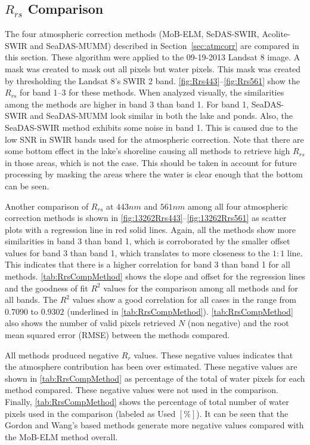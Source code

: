 \subsection{$R_{rs}$ Comparison}

 The four atmospheric correction methods (MoB-ELM, SeDAS-SWIR, Acolite-SWIR and SeaDAS-MUMM) described in Section~\ref{sec:atmcorr}  are compared in this section. These algorithm were applied to the 09-19-2013 Landsat 8 image. A mask was created to mask out all pixels but water pixels. This mask was created by thresholding the Landsat 8's SWIR 2 band. \autoref{fig:Rrs443}--\ref{fig:Rrs561} show the $R_{rs}$ for band 1--3 for these methods. When analyzed visually, the similarities among the methods are higher in band 3 than band 1. For band 1, SeaDAS-SWIR and SeaDAS-MUMM look similar in both the lake and ponds. Also, the SeaDAS-SWIR method exhibits some noise in band 1. This is caused due to the low SNR in SWIR bands used for the atmospheric correction. Note that there are some bottom effect in the lake's shoreline causing all methods to retrieve high $R_{rs}$ in those areas, which is not the case. This should be taken in account for future processing by masking the areas where the water is clear enough that the bottom can be seen.

Another comparison of $R_{rs}$ at $443nm$ and $561nm$ among all four atmospheric correction methods is shown in \autoref{fig:13262Rrs443}--\ref{fig:13262Rrs561} as scatter plots with a regression line in red solid lines. Again, all the methods show more similarities in band 3 than band 1, which is corroborated by the smaller offset values for band 3 than band 1, which translates to more closeness to the $1:1$ line. This indicates that there is a higher correlation for band 3 than band 1 for all methods. \autoref{tab:RrsCompMethod} shows the slope and offset for the regression lines and the goodness of fit $R^2$ values for the comparison among all methods and for all bands. The $R^2$ values show a good correlation for all cases in the range from $0.7090$ to $0.9302$ (underlined in \autoref{tab:RrsCompMethod}). \autoref{tab:RrsCompMethod} also shows the number of valid pixels retrieved $N$ (non negative) and the root mean squared error (RMSE) between the methods compared. 

All methods produced negative $R_{r}$ values. These negative values indicates that the atmosphere contribution has been over estimated. These negative values are shown in \autoref{tab:RrsCompMethod} as percentage of the total of water pixels for each method compared. These negative values were not used in the comparison. Finally, \autoref{tab:RrsCompMethod} shows the percentage of total number of water pixels used in the comparison (labeled as Used $[\%]$). It can be seen that the Gordon and Wang's based methods generate more negative values compared with the MoB-ELM method overall. 

